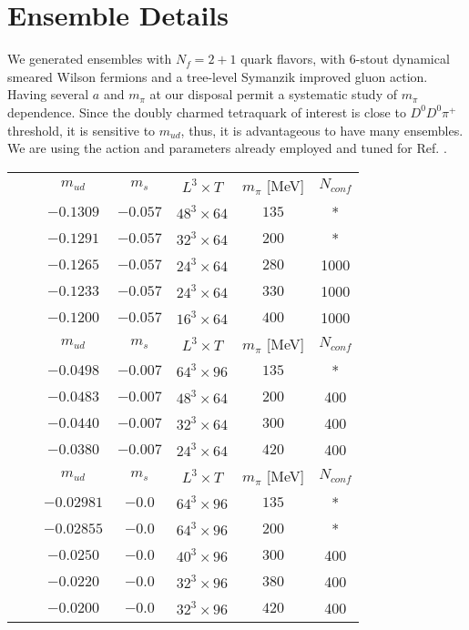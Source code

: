 \section{Ensemble Details}
We generated ensembles with $N_f = 2+1$ quark flavors, with 6-stout dynamical smeared Wilson fermions and a tree-level Symanzik improved gluon action. Having several $a$ and $m_{\pi}$ at our disposal permit a systematic study of $m_{\pi}$ dependence. Since the doubly charmed tetraquark of interest is close to $D^0D^0\pi^+$ threshold, it is sensitive to $m_{ud}$, thus, it is advantageous to have many ensembles. 
We are using the action and parameters already employed and tuned for Ref. \cite{Durr:2008zz}. 

\begin{tabular}{ccccccc}
 & & $m_{ud}$ & $m_{s}$ & $L^3 \times T$ & $m_\pi$ [MeV] & $N_{conf}$\\
 
& & $-0.1309$ & $-0.057$ & $48^3\times64$ & $135$ & * \\
& & $-0.1291$ & $-0.057$ & $32^3\times64$ & $200$ & * \\
& & $-0.1265$ & $-0.057$ & $24^3\times64$ & $280$ & 1000 \\
& & $-0.1233$ & $-0.057$ & $24^3\times64$ & $330$ & 1000 \\
& & $-0.1200$ & $-0.057$ & $16^3\times64$ & $400$ & 1000 \\
\midrule
{} && $m_{ud}$ & $m_{s}$ & $L^3 \times T$ & $m_\pi$ [MeV] & $N_{conf}$\\
 
& & $-0.0498$ & $-0.007$ & $64^3\times96$ & $135$ & * \\
& & $-0.0483$ & $-0.007$ & $48^3\times64$ & $200$ & 400 \\
& & $-0.0440$ & $-0.007$ & $32^3\times64$ & $300$ & 400 \\
& & $-0.0380$ & $-0.007$ & $24^3\times64$ & $420$ & 400 \\
\midrule
{} && $m_{ud}$ & $m_{s}$ & $L^3 \times T$ & $m_\pi$ [MeV] & $N_{conf}$\\
 
& & $-0.02981$ & $-0.0$ & $64^3\times96$ & $135$ & * \\
& & $-0.02855$ & $-0.0$ & $64^3\times96$ & $200$ & * \\
& & $-0.0250$ & $-0.0$ & $40^3\times96$ & $300$ & 400 \\
& & $-0.0220$ & $-0.0$ & $32^3\times96$ & $380$ & 400 \\
& & $-0.0200$ & $-0.0$ & $32^3\times96$ & $420$ & 400 \\
\end{tabular}



